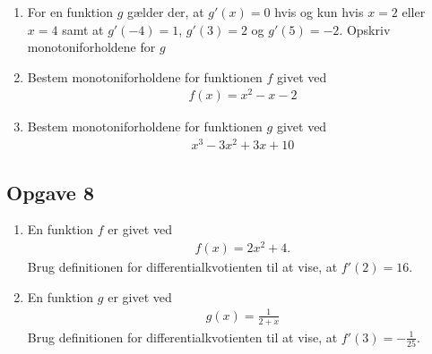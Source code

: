 \begin{enumerate}[label=\roman*)]
	\item For en funktion $g$ gælder der, at $g'(x) = 0$ hvis og kun hvis $x = 2$ eller $x = 4$ samt at $g'(-4) = 1$, $g'(3) = 2$ og $g'(5) = -2$.   
	Opskriv monotoniforholdene for $g$	
	\item Bestem monotoniforholdene for funktionen $f$ givet ved
	\begin{align*}
		f(x) = x^2 -x - 2
	\end{align*}
	\item Bestem monotoniforholdene for funktionen $g$ givet ved
	\begin{align*}
		x^3 - 3x^2 + 3x + 10
	\end{align*}

\end{enumerate}
\newpage

\subsection*{Opgave 8}
\begin{enumerate}[label = \roman*)]
	\item En funktion $f$ er givet ved
	\begin{align*}
		f(x) = 2x^2 + 4.
	\end{align*}
	Brug definitionen for differentialkvotienten til at vise, at $f'(2) = 16$. 
	\item En funktion $g$ er givet ved
	\begin{align*}
		g(x) = \frac{1}{2+x}
	\end{align*}
	Brug definitionen for differentialkvotienten til at vise, at $f'(3) = -\frac{1}{25}$.
\end{enumerate}